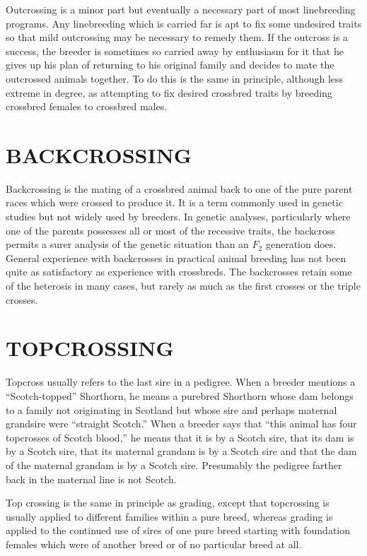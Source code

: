 Outcrossing is a minor part but eventually a necessary part of most
linebreeding programs. Any linebreeding which is carried far is apt to
fix some undesired traits so that mild outcrossing may be necessary to
remedy them. If the outcross is a success, the breeder is sometimes so
carried away by enthusiasm for it that he gives up his plan of returning
to his original family and decides to mate the outcrossed animals together.
To do this is the same in principle, although less extreme in degree,
as attempting to fix desired crossbred traits by breeding crossbred
females to crossbred males.

\section*{BACKCROSSING}

Backcrossing is the mating of a crossbred animal back to one of the
pure parent races which were crossed to produce it. It is a term commonly
used in genetic studies but not widely used by breeders. In
genetic analyses, particularly where one of the parents possesses all or
most of the recessive traits, the backcross permits a surer analysis of the
genetic situation than an $F_2$ generation does. General experience with
backcrosses in practical animal breeding has not been quite as satisfactory
as experience with crossbreds. The backcrosses retain some of the
heterosis in many cases, but rarely as much as the first crosses or the
triple crosses.

\section*{TOPCROSSING}

Topcross usually refers to the last sire in a pedigree. When a breeder
mentions a ``Scotch-topped'' Shorthorn, he means a purebred Shorthorn
whose dam belongs to a family not originating in Scotland but whose
sire and perhaps maternal grandsire were ``straight Scotch.'' When a
breeder says that ``this animal has four topcrosses of Scotch blood,'' he
means that it is by a Scotch sire, that its dam is by a Scotch sire, that its
maternal grandam is by a Scotch sire and that the dam of the maternal
grandam is by a Scotch sire. Presumably the pedigree farther back in the
maternal line is not Scotch.

Top crossing is the same in principle as grading, except that topcrossing
is usually applied to different families within a pure breed,
whereas grading is applied to the continued use of sires of one pure
breed starting with foundation females which were of another breed or
of no particular breed at all.

